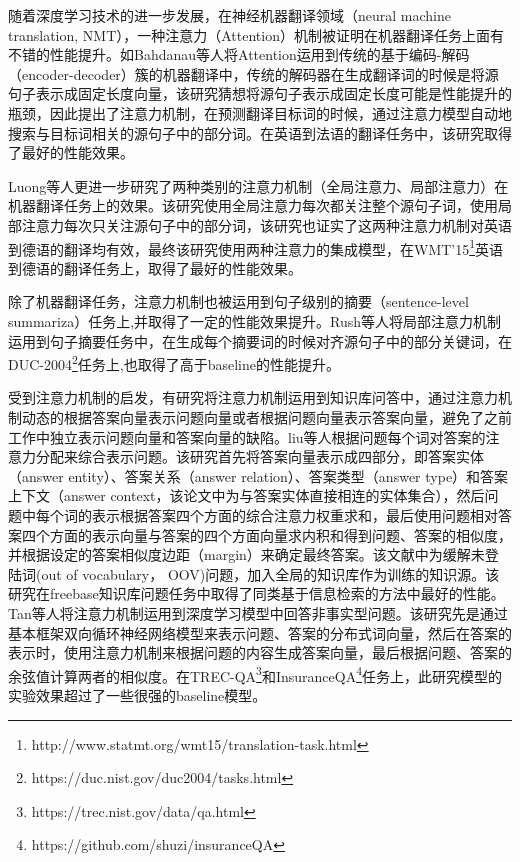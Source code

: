 随着深度学习技术的进一步发展，在神经机器翻译领域（neural machine translation, NMT），一种注意力（Attention）机制被证明在机器翻译任务上面有不错的性能提升。如Bahdanau\cite{Bahdanau}等人将Attention运用到传统的基于编码-解码（encoder-decoder）簇的机器翻译中，传统的解码器在生成翻译词的时候是将源句子表示成固定长度向量，该研究猜想将源句子表示成固定长度可能是性能提升的瓶颈，因此提出了注意力机制，在预测翻译目标词的时候，通过注意力模型自动地搜索与目标词相关的源句子中的部分词。在英语到法语的翻译任务中，该研究取得了最好的性能效果。

Luong\cite{Luong}等人更进一步研究了两种类别的注意力机制（全局注意力、局部注意力）在机器翻译任务上的效果。该研究使用全局注意力每次都关注整个源句子词，使用局部注意力每次只关注源句子中的部分词，该研究也证实了这两种注意力机制对英语到德语的翻译均有效，最终该研究使用两种注意力的集成模型，在WMT'15\footnote{http://www.statmt.org/wmt15/translation-task.html}英语到德语的翻译任务上，取得了最好的性能效果。

除了机器翻译任务，注意力机制也被运用到句子级别的摘要（sentence-level summariza）任务上,并取得了一定的性能效果提升。Rush\cite{Rush}等人将局部注意力机制运用到句子摘要任务中，在生成每个摘要词的时候对齐源句子中的部分关键词，在DUC-2004\footnote{https://duc.nist.gov/duc2004/tasks.html}任务上,也取得了高于baseline的性能提升。

受到注意力机制的启发，有研究将注意力机制运用到知识库问答中，通过注意力机制动态的根据答案向量表示问题向量或者根据问题向量表示答案向量，避免了之前工作中独立表示问题向量和答案向量的缺陷。liu\cite{Liu}等人根据问题每个词对答案的注意力分配来综合表示问题。该研究首先将答案向量表示成四部分，即答案实体（answer entity）、答案关系（answer relation）、答案类型（answer type）和答案上下文（answer context，该论文中为与答案实体直接相连的实体集合），然后问题中每个词的表示根据答案四个方面的综合注意力权重求和，最后使用问题相对答案四个方面的表示向量与答案的四个方面向量求内积和得到问题、答案的相似度，并根据设定的答案相似度边距（margin）来确定最终答案。该文献中为缓解未登陆词(out of vocabulary， OOV)问题，加入全局的知识库作为训练的知识源。该研究在freebase知识库问题任务中取得了同类基于信息检索的方法中最好的性能。Tan\cite{Tan}等人将注意力机制运用到深度学习模型中回答非事实型问题。该研究先是通过基本框架双向循环神经网络模型来表示问题、答案的分布式词向量，然后在答案的表示时，使用注意力机制来根据问题的内容生成答案向量，最后根据问题、答案的余弦值计算两者的相似度。在TREC-QA\footnote{https://trec.nist.gov/data/qa.html}和InsuranceQA\footnote{https://github.com/shuzi/insuranceQA}任务上，此研究模型的实验效果超过了一些很强的baseline模型。

